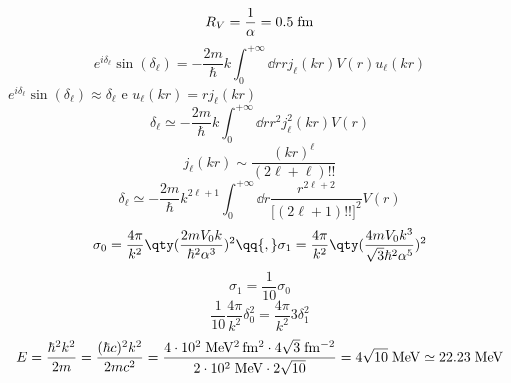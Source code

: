 \begin{soluzione}
{   \begin{equation*}
      R_V
      =\frac{1}{\alpha}
      =0.5 \rm \; fm
   \end{equation*}
   \begin{equation*}
      e^{i \delta_{\ell}} \sin{(\delta_{\ell})}
      =-\frac{2 m}{\hbar} k \int_{0}^{+\infty} \dd{r} r j_{\ell}(k r) V(r) u_{\ell}(kr)
   \end{equation*}
   $e^{i \delta_{\ell}} \sin{(\delta_{\ell})} \approx \delta_{\ell}$ e $u_{\ell}(kr)=r j_{\ell}(k r)$
   \begin{equation*}
      \delta_{\ell}
      \simeq -\frac{2 m}{\hbar} k \int_{0}^{+\infty} \dd{r} r^2 j^2_{\ell}(k r) V(r)
   \end{equation*}
   \begin{equation*}
      j_{\ell}(kr)
      \sim \frac{(kr)^{\ell}}{(2 \ell + \ell)!!}
   \end{equation*}
   \begin{equation*}
      \delta_{\ell}
      \simeq -\frac{2 m}{\hbar} k^{2 \ell + 1} \int_{0}^{+\infty} \dd{r} \frac{ r^{2 \ell + 2}}{\bigl[ (2 \ell + 1)!! \bigr]^2} V(r)
   \end{equation*}
   \begin{equation*}
      \sigma_0
      =\frac{4 \pi}{k^2} \qty( \frac{2 m V_0 k}{\hbar^2 \alpha^3} )^2
      \qq{,}
      \sigma_1
      =\frac{4 \pi}{k^2} \qty( \frac{4 m V_0 k^3}{\sqrt{3} \hbar^2 \alpha^5} )^2
   \end{equation*}
   \begin{equation*}
      \sigma_1
      =\frac{1}{10} \sigma_0
   \end{equation*}
   \begin{equation*}
      \frac{1}{10} \frac{4 \pi}{k^2} \delta_0^2
      =\frac{4 \pi}{k^2} 3 \delta_1^2
   \end{equation*}
   \begin{equation*}
      E
      =\frac{\hbar^2 k^2}{2 m}
      =\frac{(\hbar c)^2 k^2}{2 m c^2}
      =\rm \frac{4 \cdot 10^2 \; MeV^2 \, fm^2 \cdot 4\sqrt{3} \; fm^{-2}}{2 \cdot 10^2 \; MeV \cdot 2\sqrt{10}}
      =\rm 4\sqrt{10} \; MeV
      \simeq \rm 22.23 \; MeV
   \end{equation*}
      }
\end{soluzione}

\newpage
\setcounter{equation}{0}

